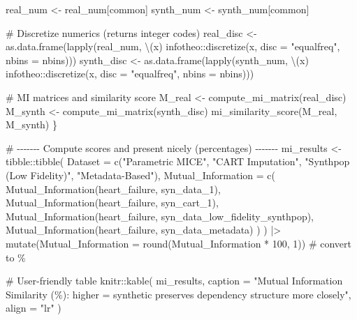 \documentclass[
  letterpaper,
  DIV=11,
  numbers=noendperiod]{scrartcl}
\newenvironment{Shaded}{\begin{snugshade}}{\end{snugshade}}
\newcommand{\AttributeTok}[1]{\textcolor[rgb]{0.40,0.45,0.13}{#1}}
\newcommand{\CommentTok}[1]{\textcolor[rgb]{0.37,0.37,0.37}{#1}}
\newcommand{\DecValTok}[1]{\textcolor[rgb]{0.68,0.00,0.00}{#1}}
\newcommand{\FunctionTok}[1]{\textcolor[rgb]{0.28,0.35,0.67}{#1}}
\newcommand{\NormalTok}[1]{\textcolor[rgb]{0.00,0.23,0.31}{#1}}
\newcommand{\OtherTok}[1]{\textcolor[rgb]{0.00,0.23,0.31}{#1}}
\newcommand{\SpecialCharTok}[1]{\textcolor[rgb]{0.37,0.37,0.37}{#1}}
\newcommand{\StringTok}[1]{\textcolor[rgb]{0.13,0.47,0.30}{#1}}
\begin{document}
\begin{Shaded}
\begin{Highlighting}[]
\NormalTok{  real\_num  }\OtherTok{\textless{}{-}}\NormalTok{ real\_num[common]}
\NormalTok{  synth\_num }\OtherTok{\textless{}{-}}\NormalTok{ synth\_num[common]}

  \CommentTok{\# Discretize numerics (returns integer codes)}
\NormalTok{  real\_disc  }\OtherTok{\textless{}{-}} \FunctionTok{as.data.frame}\NormalTok{(}\FunctionTok{lapply}\NormalTok{(real\_num,  \textbackslash{}(x) infotheo}\SpecialCharTok{::}\FunctionTok{discretize}\NormalTok{(x, }\AttributeTok{disc =} \StringTok{"equalfreq"}\NormalTok{, }\AttributeTok{nbins =}\NormalTok{ nbins)))}
\NormalTok{  synth\_disc }\OtherTok{\textless{}{-}} \FunctionTok{as.data.frame}\NormalTok{(}\FunctionTok{lapply}\NormalTok{(synth\_num, \textbackslash{}(x) infotheo}\SpecialCharTok{::}\FunctionTok{discretize}\NormalTok{(x, }\AttributeTok{disc =} \StringTok{"equalfreq"}\NormalTok{, }\AttributeTok{nbins =}\NormalTok{ nbins)))}

  \CommentTok{\# MI matrices and similarity score}
\NormalTok{  M\_real  }\OtherTok{\textless{}{-}} \FunctionTok{compute\_mi\_matrix}\NormalTok{(real\_disc)}
\NormalTok{  M\_synth }\OtherTok{\textless{}{-}} \FunctionTok{compute\_mi\_matrix}\NormalTok{(synth\_disc)}
  \FunctionTok{mi\_similarity\_score}\NormalTok{(M\_real, M\_synth)}
\NormalTok{\}}

\CommentTok{\# {-}{-}{-}{-}{-}{-}{-} Compute scores and present nicely (percentages) {-}{-}{-}{-}{-}{-}{-}}
\NormalTok{mi\_results }\OtherTok{\textless{}{-}}\NormalTok{ tibble}\SpecialCharTok{::}\FunctionTok{tibble}\NormalTok{(}
  \AttributeTok{Dataset =} \FunctionTok{c}\NormalTok{(}\StringTok{"Parametric MICE"}\NormalTok{, }\StringTok{"CART Imputation"}\NormalTok{, }\StringTok{"Synthpop (Low Fidelity)"}\NormalTok{, }\StringTok{"Metadata{-}Based"}\NormalTok{),}
  \AttributeTok{Mutual\_Information =} \FunctionTok{c}\NormalTok{(}
    \FunctionTok{Mutual\_Information}\NormalTok{(heart\_failure, syn\_data\_1),}
    \FunctionTok{Mutual\_Information}\NormalTok{(heart\_failure, syn\_cart\_1),}
    \FunctionTok{Mutual\_Information}\NormalTok{(heart\_failure, syn\_data\_low\_fidelity\_synthpop),}
    \FunctionTok{Mutual\_Information}\NormalTok{(heart\_failure, syn\_data\_metadata)}
\NormalTok{  )}
\NormalTok{) }\SpecialCharTok{|\textgreater{}}
  \FunctionTok{mutate}\NormalTok{(}\AttributeTok{Mutual\_Information =} \FunctionTok{round}\NormalTok{(Mutual\_Information }\SpecialCharTok{*} \DecValTok{100}\NormalTok{, }\DecValTok{1}\NormalTok{))  }\CommentTok{\# convert to \%}

\CommentTok{\# User{-}friendly table}
\NormalTok{knitr}\SpecialCharTok{::}\FunctionTok{kable}\NormalTok{(}
\NormalTok{  mi\_results,}
  \AttributeTok{caption =} \StringTok{"Mutual Information Similarity (\%): higher = synthetic preserves dependency structure more closely"}\NormalTok{,}
  \AttributeTok{align =} \StringTok{"lr"}
\NormalTok{)}
\end{Highlighting}
\end{Shaded}
\end{document}
